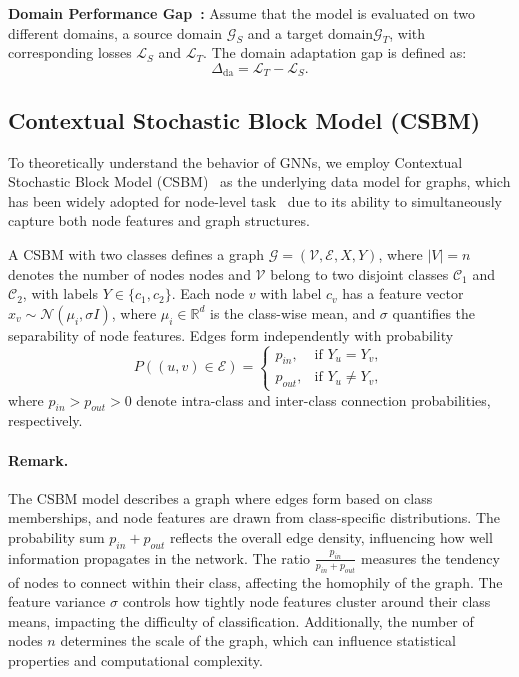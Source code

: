 \noindent\textbf{Domain Performance Gap~\cite{ben2010theory}:}  
Assume that the model is evaluated on two different domains, a source domain $\mathcal{G}_S $ and a target domain$\mathcal{G}_T$, with corresponding losses \(\mathcal{L}_S\) and \(\mathcal{L}_T\). The domain adaptation gap is defined as:
\[
\Delta_{\text{da}} = \mathcal{L}_T - \mathcal{L}_S.
\]
\subsection{Contextual Stochastic Block Model (CSBM)}
\label{sec: csbm}

To theoretically understand the behavior of GNNs, we employ Contextual Stochastic Block Model (CSBM)~\cite{deshpande2018contextual} as the underlying data model for graphs, which has been widely adopted for node-level task~\cite{Ma2021IsHA, baranwal2021graph, wang2022augmentation, baranwal2023effects, wang2022can, fountoulakis2022graph} due to its ability to simultaneously capture both node features and graph structures.

\begin{definition}
A CSBM with two classes defines a graph \( \mathcal{G} = (\mathcal{V}, \mathcal{E}, X, Y) \), where  
\(|V|=n\) denotes the number of nodes nodes and \( \mathcal{V} \) belong to two disjoint classes \( \mathcal{C}_1 \) and \( \mathcal{C}_2 \), with labels \( Y \in \{c_1, c_2\} \). Each node \( v \) with label \( c_v \) has a feature vector \( x_v \sim \mathcal{N}(\mu_i, \sigma I) \), where \( \mu_i \in \mathbb{R}^d \) is the class-wise mean, and $\sigma$ quantifies the separability of node features. Edges form independently with probability  
\[
P((u,v) \in \mathcal{E}) =
\begin{cases}
    p_{in}, & \text{if } Y_u = Y_v, \\
    p_{out}, & \text{if } Y_u \neq Y_v,
\end{cases}
\]
where \( p_{in} > p_{out} > 0 \) denote intra-class and inter-class connection probabilities, respectively.
\end{definition}
\paragraph{Remark.}  
The CSBM model describes a graph where edges form based on class memberships, and node features are drawn from class-specific distributions. The probability sum \( p_{in} + p_{out} \) reflects the overall edge density, influencing how well information propagates in the network. The ratio \( \frac{p_{in}}{p_{in} + p_{out}} \) measures the tendency of nodes to connect within their class, affecting the homophily of the graph. The feature variance \( \sigma \) controls how tightly node features cluster around their class means, impacting the difficulty of classification. Additionally, the number of nodes \( n \) determines the scale of the graph, which can influence statistical properties and computational complexity.

